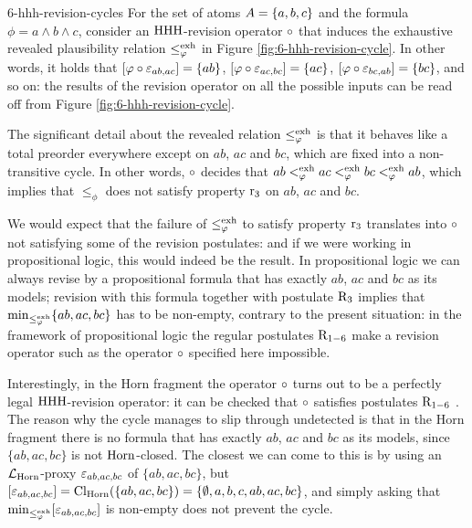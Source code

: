 \begin{xmpl}{\cite{DelgrandeP15,DelgrandePW18}}{6-hhh-revision-cycles}
	For the set of atoms $A=\{a,b,c\}$
	and the formula $\phi=a\land b\land c$,	
	consider an ${\mathrm{HHH}}$-revision operator $\circ$
	that induces the exhaustive revealed plausibility
	relation $\le^{{\operatorname{exh}}}_{\varphi}$ in Figure \ref{fig:6-hhh-revision-cycle}.
	In other words, it holds that 
	$[\varphi\circ\varepsilon_{ab,ac}]=\{ab\}$,
	$[\varphi\circ\varepsilon_{ac,bc}]=\{ac\}$,
	$[\varphi\circ\varepsilon_{bc,ab}]=\{bc\}$,
	and so on:
	the results of the revision operator on
	all the possible inputs can be read off 
	from Figure \ref{fig:6-hhh-revision-cycle}.

	The significant detail about the 
	revealed relation $\le^{{\operatorname{exh}}}_{\varphi}$
	is that it 
	behaves like a total preorder everywhere 
	except on $ab$, $ac$ and $bc$,
	which are fixed into a non-transitive cycle.
	In other words, $\circ$ decides
	that $ab <^{{\operatorname{exh}}}_{\varphi} ac <^{{\operatorname{exh}}}_{\varphi} bc <^{{\operatorname{exh}}}_{\varphi} ab$,
	which implies that $\le_{\phi}$ does not satisfy property $\mathrm{r}_{3}$
	on $ab$, $ac$ and $bc$.

	We would expect that the failure of $\le^{{\operatorname{exh}}}_{\varphi}$ to 
	satisfy property $\mathrm{r}_{3}$
	translates into $\circ$ 
	not satisfying some of the revision postulates:
	and if we were working in propositional logic,
	this would indeed be the result.
	In propositional logic we can always revise by a 
	propositional formula
	that has exactly $ab$, $ac$ and $bc$ as its models;
	revision with this formula 
	together with postulate $\mathrm{R}_{3}$ 
	implies that ${\operatorname{min}}_{\le^{{\operatorname{exh}}}_{\varphi}}\{ab,ac,bc\}$
	has to be non-empty,
	contrary to the present situation:
	in the framework of propositional logic 
	the regular postulates $\mathrm{R}_{1-6}$ make 
	a revision operator such as the operator $\circ$ specified here 
	impossible.

	Interestingly, in the Horn fragment the operator $\circ$
	turns out to be a perfectly legal ${\mathrm{HHH}}$-revision operator:
	it can be checked that $\circ$ satisfies postulates $\mathrm{R}_{1-6}$
	\cite{DelgrandeP15,DelgrandePW18}.
	The reason why the cycle manages to slip through undetected
	is that in the Horn fragment there is no formula
	that has exactly $ab$, $ac$ and $bc$ as its models,
	since $\{ab,ac,bc\}$ is not $\mathrm{Horn}$-closed.
	The closest we can come to this is by 
	using an $\mathcal{L}_{\mathrm{Horn}}$-proxy 
	$\varepsilon_{ab,ac,bc}$ of $\{ab,ac,bc\}$,
	but $[\varepsilon_{ab,ac,bc}]={\operatorname{Cl}}_{\mathrm{Horn}}(\{ab,ac,bc\})=\{\emptyset,a,b,c,ab,ac,bc\}$,
	and simply asking 
	that ${\operatorname{min}}_{\le^{{\operatorname{exh}}}_{\varphi}}[\varepsilon_{ab,ac,bc}]$ is non-empty 
	does not prevent the cycle.
	

\end{xmpl}
